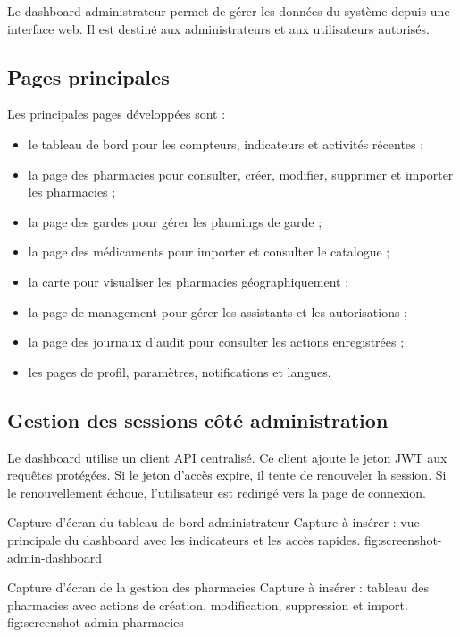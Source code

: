 Le dashboard administrateur permet de gérer les données du système depuis une interface web. Il est
destiné aux administrateurs et aux utilisateurs autorisés.

\subsection{Pages principales}

Les principales pages développées sont :

\begin{itemize}
    \item le tableau de bord pour les compteurs, indicateurs et activités récentes ;
    \item la page des pharmacies pour consulter, créer, modifier, supprimer et importer les pharmacies ;
    \item la page des gardes pour gérer les plannings de garde ;
    \item la page des médicaments pour importer et consulter le catalogue ;
    \item la carte pour visualiser les pharmacies géographiquement ;
    \item la page de management pour gérer les assistants et les autorisations ;
    \item la page des journaux d'audit pour consulter les actions enregistrées ;
    \item les pages de profil, paramètres, notifications et langues.
\end{itemize}

\subsection{Gestion des sessions côté administration}

Le dashboard utilise un client API centralisé. Ce client ajoute le jeton JWT aux requêtes protégées. Si le
jeton d'accès expire, il tente de renouveler la session. Si le renouvellement échoue, l'utilisateur est
redirigé vers la page de connexion.

\placeholderfigure
{Capture d'écran du tableau de bord administrateur}
{Capture à insérer : vue principale du dashboard avec les indicateurs et les accès rapides.}
{fig:screenshot-admin-dashboard}

\placeholderfigure
{Capture d'écran de la gestion des pharmacies}
{Capture à insérer : tableau des pharmacies avec actions de création, modification, suppression et import.}
{fig:screenshot-admin-pharmacies}

